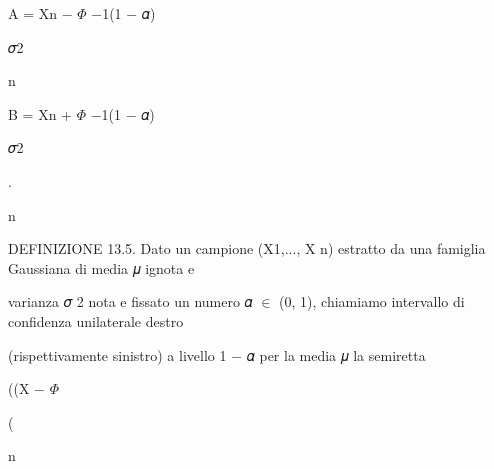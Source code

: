 \documentclass[a4paper,portrait,12pt]{article}
\begin{document}
\begin{flushleft}
A = Xn $-$ $\Phi$ $-$1(1 $-$ 𝛼)
\end{flushleft}





\begin{flushleft}
𝜎2
\end{flushleft}


\begin{flushleft}
n
\end{flushleft}





\begin{flushleft}
B = Xn + $\Phi$ $-$1(1 $-$ 𝛼)
\end{flushleft}





\begin{flushleft}
𝜎2
\end{flushleft}


.


\begin{flushleft}
n
\end{flushleft}





\begin{flushleft}
DEFINIZIONE 13.5. Dato un campione (X1,..., X n) estratto da una famiglia Gaussiana di media 𝜇 ignota e
\end{flushleft}


\begin{flushleft}
varianza 𝜎 2 nota e fissato un numero 𝛼 $\in$ (0, 1), chiamiamo intervallo di confidenza unilaterale destro
\end{flushleft}


\begin{flushleft}
(rispettivamente sinistro) a livello 1 $-$ 𝛼 per la media 𝜇 la semiretta
\end{flushleft}





\begin{flushleft}
((X $-$ $\Phi$
\end{flushleft}


(


\begin{flushleft}
n
\end{flushleft}
\end{document}
